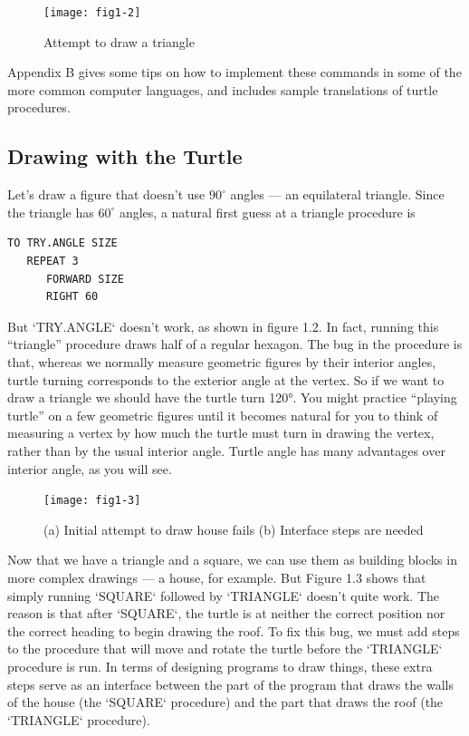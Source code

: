 \documentclass{book}
\begin{document}
\begin{figure}
\begin{center}
\texttt{[image: fig1-2]}
\caption{Attempt to draw a triangle}
\end{center}
\end{figure}

Appendix B gives some tips on how to implement these commands in
some of the more common computer languages, and includes sample
translations of turtle procedures.

\subsection{Drawing with the Turtle}
Let's draw a figure that doesn't use $90^{\circ}$ angles --- an equilateral triangle. Since the triangle has $60^{\circ}$ angles, a natural first guess at a triangle procedure is

\begin{verbatim}
TO TRY.ANGLE SIZE
   REPEAT 3
      FORWARD SIZE
      RIGHT 60
\end{verbatim}
But \textsc{`TRY.ANGLE`} doesn't work, as shown in figure 1.2. In fact, running this ``triangle'' procedure draws half of a regular hexagon. The bug in the procedure is that, whereas we normally measure geometric figures by their interior angles, turtle turning corresponds to the exterior angle at the vertex. So if we want to draw a triangle we should have the turtle turn 120°. You might practice ``playing turtle'' on a few geometric figures until it becomes natural for you to think of measuring a vertex by how much the turtle must turn in drawing the vertex, rather than by the usual interior angle. Turtle angle has many advantages over interior angle, as you will see.

\begin{figure}
\begin{center}
\texttt{[image: fig1-3]}
\caption{(a) Initial attempt to draw house fails (b) Interface steps are needed}
\end{center}
\end{figure}


Now that we have a triangle and a square, we can use them as building blocks in more complex drawings --- a house, for example. But Figure 1.3 shows that simply running \textsc{`SQUARE`} followed by \textsc{`TRIANGLE`} doesn't quite work. The reason is that after \textsc{`SQUARE`}, the turtle is at neither the correct position nor the correct heading to begin drawing the roof. To fix this bug, we must add steps to the procedure that will move and rotate the turtle before the \textsc{`TRIANGLE`} procedure is run. In terms of designing programs to draw things, these extra steps serve as an interface between the part of the program that draws the walls of the house (the \textsc{`SQUARE`} procedure) and the part that draws the roof (the \textsc{`TRIANGLE`} procedure).
\end{document}
